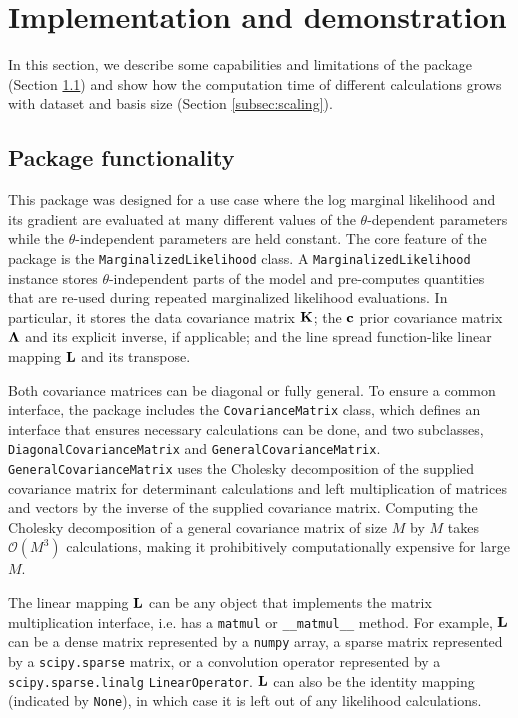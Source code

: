 \documentclass[manuscript]{aastex62}
\newcommand{\vx}[1]{{\bf {#1}}}
\begin{document}
\section{Implementation and demonstration}
\label{sec:package-and-demos}

In this section, we describe some capabilities and limitations of the package (Section \ref{subsec:package-functionality}) and show how the computation time of different calculations grows with dataset and basis size (Section \ref{subsec:scaling}).

\subsection{Package functionality}
\label{subsec:package-functionality}
This package was designed for a use case where the log marginal likelihood and its gradient are evaluated at many different values of the $\theta$-dependent parameters while the $\theta$-independent parameters are held constant.
The core feature of the package is the \texttt{MarginalizedLikelihood} class.
A \texttt{MarginalizedLikelihood} instance stores $\theta$-independent parts of the model and pre-computes quantities that are re-used during repeated marginalized likelihood evaluations.
In particular, it stores the data covariance matrix $\vx{K}$; the $\vx{c}$ prior covariance matrix $\vx{\Lambda}$ and its explicit inverse, if applicable; and the line spread function-like linear mapping $\vx{L}$ and its transpose.

Both covariance matrices can be diagonal or fully general.
To ensure a common interface, the package includes the \texttt{CovarianceMatrix} class, which defines an interface that ensures necessary calculations can be done, and two subclasses, \texttt{DiagonalCovarianceMatrix} and \texttt{GeneralCovarianceMatrix}.
\texttt{GeneralCovarianceMatrix} uses the Cholesky decomposition of the supplied covariance matrix for determinant calculations and left multiplication of matrices and vectors by the inverse of the supplied covariance matrix.
Computing the Cholesky decomposition of a general covariance matrix of size $M$ by $M$ takes $\mathcal{O}(M^3)$ calculations, making it prohibitively computationally expensive for large $M$.

The linear mapping $\vx{L}$ can be any object that implements the matrix multiplication interface, i.e. has a \texttt{matmul} or \texttt{\_\_matmul\_\_} method.
For example, $\vx{L}$ can be a dense matrix represented by a \texttt{numpy} array, a sparse matrix represented by a \texttt{scipy.sparse} matrix, or a convolution operator represented by a \texttt{scipy.sparse.linalg} \texttt{LinearOperator}.
$\vx{L}$ can also be the identity mapping (indicated by \texttt{None}), in which case it is left out of any likelihood calculations.
\end{document}
